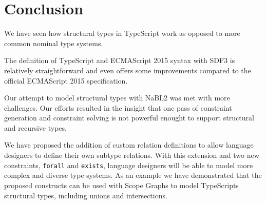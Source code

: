 \section{Conclusion}

We have seen how structural types in TypeScript work as opposed to more common nominal type systems.

The definition of TypeScript and ECMAScript 2015 syntax with SDF3 is relatively straightforward
and even offers some improvements compared to the official ECMAScript 2015 specification.

Our attempt to model structural types with NaBL2 was met with more challenges.
Our efforts resulted in the insight that one pass of constraint generation and constraint solving
is not powerful enought to support structural and recursive types.

We have proposed the addition of custom relation definitions to allow language designers to define their own
subtype relations.
With this extension and two new constraints, \texttt{forall} and \texttt{exists}, language designers will 
be able to model more complex and diverse type systems.
As an example we have demonstrated that the proposed constructs can be used with Scope Graphs to model 
TypeScripts structural types, including unions and intersections.
\FloatBarrier